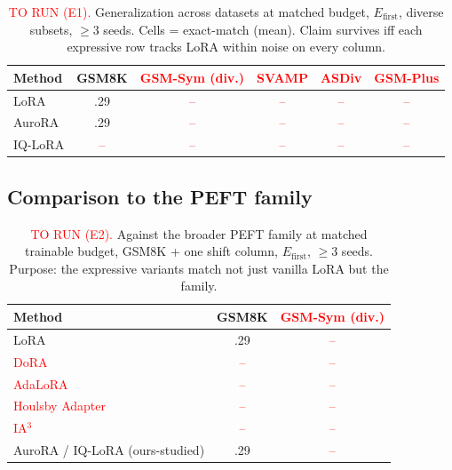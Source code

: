 \documentclass[preprint,11pt]{elsarticle}
\begin{document}
\begin{table}[t]\centering
\caption{\textcolor{red}{TO RUN (E1).} Generalization across datasets at matched budget, $E_{\text{first}}$, diverse
subsets, $\ge3$ seeds. Cells = exact-match (mean). Claim survives iff each expressive row tracks LoRA within noise on every
column.}
\label{tab:datasets}
\begin{tabular}{lccccc}
\toprule
Method & GSM8K & \textcolor{red}{GSM-Sym (div.)} & \textcolor{red}{SVAMP} & \textcolor{red}{ASDiv} & \textcolor{red}{GSM-Plus}\\
\midrule
LoRA        & .29 & \textcolor{red}{--} & \textcolor{red}{--} & \textcolor{red}{--} & \textcolor{red}{--}\\
AuroRA      & .29 & \textcolor{red}{--} & \textcolor{red}{--} & \textcolor{red}{--} & \textcolor{red}{--}\\
IQ-LoRA     & \textcolor{red}{--} & \textcolor{red}{--} & \textcolor{red}{--} & \textcolor{red}{--} & \textcolor{red}{--}\\
\bottomrule
\end{tabular}
\end{table}

\subsection{Comparison to the PEFT family}
\begin{table}[t]\centering
\caption{\textcolor{red}{TO RUN (E2).} Against the broader PEFT family at matched trainable budget, GSM8K + one shift
column, $E_{\text{first}}$, $\ge3$ seeds. Purpose: the expressive variants match not just vanilla LoRA but the family.}
\label{tab:baselines}
\begin{tabular}{lcc}
\toprule
Method & GSM8K & \textcolor{red}{GSM-Sym (div.)}\\
\midrule
LoRA                    & .29 & \textcolor{red}{--}\\
\textcolor{red}{DoRA}    & \textcolor{red}{--} & \textcolor{red}{--}\\
\textcolor{red}{AdaLoRA} & \textcolor{red}{--} & \textcolor{red}{--}\\
\textcolor{red}{Houlsby Adapter} & \textcolor{red}{--} & \textcolor{red}{--}\\
\textcolor{red}{IA$^3$}  & \textcolor{red}{--} & \textcolor{red}{--}\\
AuroRA / IQ-LoRA (ours-studied) & .29 & \textcolor{red}{--}\\
\bottomrule
\end{tabular}
\end{table}
\end{document}
